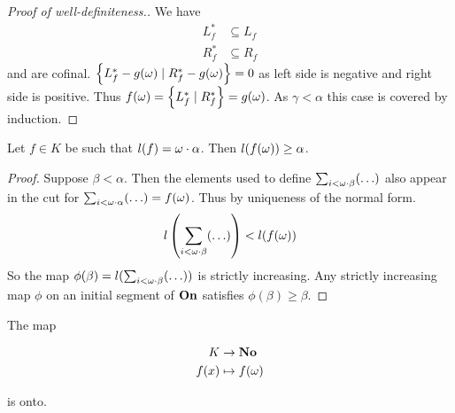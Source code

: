 \begin{proof}[Proof of well-definiteness.]
We have
\begin{align*}
	L_f^* &\subseteq L_f \\
	R_f^* &\subseteq R_f
\end{align*}
and are cofinal. $\left\{ L_f^* - g(\omega) \mid R_f^* - g(\omega) \right\} = 0$ as left side is negative and right side is positive.
Thus $f(\omega) = \left\{ L_f^* \mid R_f^* \right\} = g(\omega)$. As $\gamma < \alpha$ this case is covered by induction.
\end{proof}


\begin{lemma} \label{6.1} %
	Let $f \in K$ be such that $l(f) = \omega \cdot \alpha$. Then $l(f(\omega)) \geq \alpha$.
 \end{lemma}

\begin{proof} %
Suppose $\beta < \alpha$. Then the elements used to define $\sum_{i < \omega\cdot\beta} (\ldots)$ also appear in the cut for $\sum_{i < \omega\cdot\alpha} (\ldots) = f(\omega)$. Thus by uniqueness of the normal form.
\begin{align*}
	l\left( \sum_{i < \omega\cdot\beta} (\ldots) \right) < l(f(\omega))
\end{align*}
So the map $\phi(\beta) = l(\sum_{i < \omega\cdot\beta} (\ldots))$ is strictly increasing.
Any strictly increasing map $\phi$ on an initial segment of $\mathbf{On}$ satisfies $\phi(\beta) \geq \beta$.
 \end{proof}

\begin{lemma} %
The map

\begin{align*}
	K &\rightarrow \mathbf{No} \\
	f(x) &\mapsto f(\omega)
\end{align*}

is onto.
 \end{lemma}

